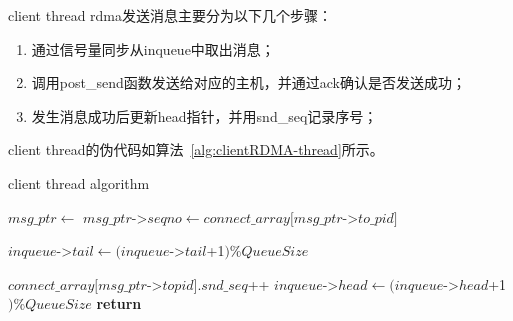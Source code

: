 {\begin{itemize}
              client thread rdma发送消息主要分为以下几个步骤：
              \begin{enumerate}[leftmargin=*, nosep]
                  \item 通过信号量同步从inqueue中取出消息；
                  \item 调用post\_send函数发送给对应的主机，并通过ack确认是否发送成功；
                  \item 发生消息成功后更新head指针，并用snd\_seq记录序号；
              \end{enumerate}

              \newpage
              client thread的伪代码如算法~\ref{alg:clientRDMA-thread}所示。
              \begin{algorithm}
                  \caption{client thread algorithm}\label{alg:clientRDMA-thread}
                  \begin{algorithmic}[1] %
                      \State {}
                      \State $msg\_ptr \gets$ 
                      \State $msg\_ptr$->$seqno \gets connect\_array[msg\_ptr$->$to\_pid]$

                      \State
                      \State {}
                      \State {}
                      \State {}
                      \State $inqueue$->$tail \gets (inqueue$->$tail$+1$) \%QueueSize$
                      \Else
                      \EndWhile
                      \EndIf

                      \State
                      \State $connect\_array[msg\_ptr$->$topid].snd\_seq$++
                      \State $inqueue$->$head \gets (inqueue$->$head$+1$) \% QueueSize$
                      \State {}
                      \EndWhile
                      \State \textbf{return}
                      \EndProcedure
                  \end{algorithmic}
              \end{algorithm}
    \end{itemize}

}

